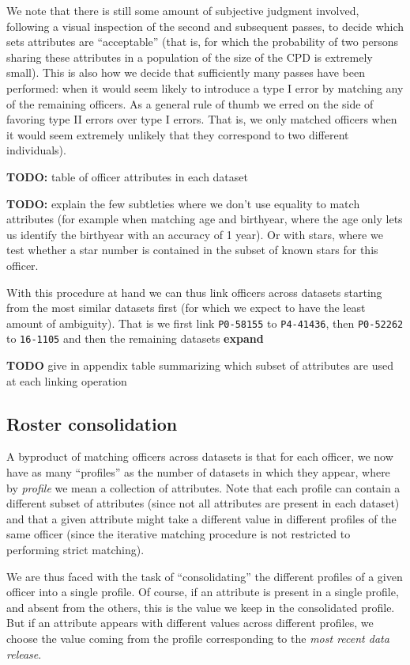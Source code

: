\documentclass{article}
\begin{document}
We note that there is still some amount of subjective judgment involved,
following a visual inspection of the second and subsequent passes, to decide
which sets attributes are ``acceptable'' (that is, for which the probability of
two persons sharing these attributes in a population of the size of the CPD is
extremely small). This is also how we decide that sufficiently many passes have
been performed: when it would seem likely to introduce a type I error by
matching any of the remaining officers. As a general rule of thumb we erred on
the side of favoring type II errors over type I errors. That is, we only
matched officers when it would seem extremely unlikely that they correspond to
two different individuals).

\textbf{TODO:} table of officer attributes in each dataset

\textbf{TODO:} explain the few subtleties where we don't use equality to match
attributes (for example when matching age and birthyear, where the age only
lets us identify the birthyear with an accuracy of 1 year). Or with stars,
where we test whether a star number is contained in the subset of known stars
for this officer.

With this procedure at hand we can thus link officers across datasets starting
from the most similar datasets first (for which we expect to have the least
amount of ambiguity). That is we first link \texttt{P0-58155} to
\texttt{P4-41436}, then \texttt{P0-52262} to \texttt{16-1105} and then the
remaining datasets \textbf{expand}

\textbf{TODO} give in appendix table summarizing which subset of attributes are
used at each linking operation 

\subsection{Roster consolidation}

A byproduct of matching officers across datasets is that for each officer, we
now have as many “profiles” as the number of datasets in which they appear,
where by \emph{profile} we mean a collection of attributes. Note that each
profile can contain a different subset of attributes (since not all attributes
are present in each dataset) and that a given attribute might take a different
value in different profiles of the same officer (since the iterative matching
procedure is not restricted to performing strict matching).

We are thus faced with the task of “consolidating” the different profiles of
a given officer into a single profile. Of course, if an attribute is present in
a single profile, and absent from the others, this is the value we keep in the
consolidated profile. But if an attribute appears with different values across
different profiles, we choose the value coming from the profile corresponding
to the \emph{most recent data release}.
\end{document}
